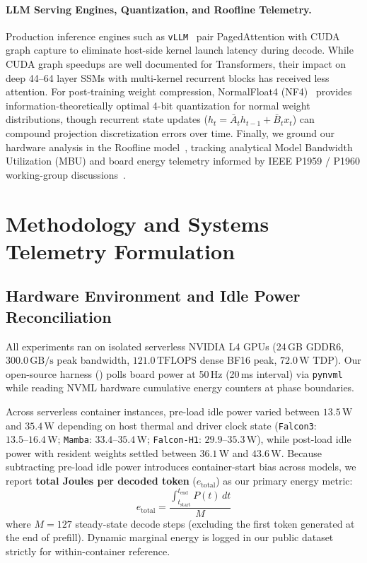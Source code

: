 \documentclass[10pt,a4paper]{article}
\begin{document}
\paragraph{LLM Serving Engines, Quantization, and Roofline Telemetry.}
Production inference engines such as \texttt{vLLM}~\cite{kwon_vllm_2023} pair PagedAttention with CUDA graph capture to eliminate host-side kernel launch latency during decode. While CUDA graph speedups are well documented for Transformers, their impact on deep 44--64 layer SSMs with multi-kernel recurrent blocks has received less attention. For post-training weight compression, NormalFloat4 (NF4)~\cite{dettmers_qlora_2023} provides information-theoretically optimal 4-bit quantization for normal weight distributions, though recurrent state updates ($h_t = \bar{A}_t h_{t-1} + \bar{B}_t x_t$) can compound projection discretization errors over time. Finally, we ground our hardware analysis in the Roofline model~\cite{williams_roofline_2009}, tracking analytical Model Bandwidth Utilization (MBU) and board energy telemetry informed by IEEE P1959 / P1960 working-group discussions~\cite{ieee_p1959_p1960}.

\section{Methodology and Systems Telemetry Formulation}

\subsection{Hardware Environment and Idle Power Reconciliation}
All experiments ran on isolated serverless NVIDIA L4 GPUs (24\,GB GDDR6, $300.0\,\text{GB/s}$ peak bandwidth, $121.0\,\text{TFLOPS}$ dense BF16 peak, $72.0\,\text{W}$ TDP). Our open-source harness () polls board power at 50\,Hz (20\,ms interval) via \texttt{pynvml} while reading NVML hardware cumulative energy counters at phase boundaries.

Across serverless container instances, pre-load idle power varied between $13.5\,\text{W}$ and $35.4\,\text{W}$ depending on host thermal and driver clock state (\texttt{Falcon3}: $13.5\text{--}16.4\,\text{W}$; \texttt{Mamba}: $33.4\text{--}35.4\,\text{W}$; \texttt{Falcon-H1}: $29.9\text{--}35.3\,\text{W}$), while post-load idle power with resident weights settled between $36.1\,\text{W}$ and $43.6\,\text{W}$. Because subtracting pre-load idle power introduces container-start bias across models, we report \textbf{total Joules per decoded token} ($e_{\mathrm{total}}$) as our primary energy metric:
\begin{equation}
e_{\mathrm{total}} = \frac{\int_{t_{\mathrm{start}}}^{t_{\mathrm{end}}} P(t)\,dt}{M}
\end{equation}
where $M=127$ steady-state decode steps (excluding the first token generated at the end of prefill). Dynamic marginal energy is logged in our public dataset strictly for within-container reference.
\end{document}
